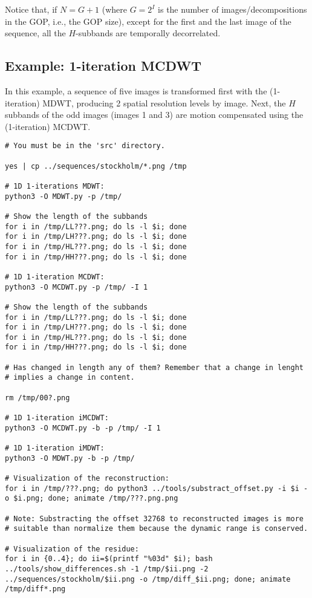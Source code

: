 Notice that, if $N=G+1$ (where $G=2^I$ is the number of
images/decompositions in the GOP, i.e., the GOP size), except for the
first and the last image of the sequence, all the $H$-subbands are
temporally decorrelated.

\subsection*{Example: 1-iteration MCDWT}
In this example, a sequence of five images is transformed first with
the (1-iteration) MDWT, producing 2 spatial resolution levels by
image. Next, the $H$ subbands of the odd images (images 1 and 3) are
motion compensated using the (1-iteration) MCDWT.

\begin{verbatim}
# You must be in the 'src' directory.

yes | cp ../sequences/stockholm/*.png /tmp

# 1D 1-iterations MDWT:
python3 -O MDWT.py -p /tmp/

# Show the length of the subbands
for i in /tmp/LL???.png; do ls -l $i; done
for i in /tmp/LH???.png; do ls -l $i; done
for i in /tmp/HL???.png; do ls -l $i; done
for i in /tmp/HH???.png; do ls -l $i; done

# 1D 1-iteration MCDWT:
python3 -O MCDWT.py -p /tmp/ -I 1

# Show the length of the subbands
for i in /tmp/LL???.png; do ls -l $i; done
for i in /tmp/LH???.png; do ls -l $i; done
for i in /tmp/HL???.png; do ls -l $i; done
for i in /tmp/HH???.png; do ls -l $i; done

# Has changed in length any of them? Remember that a change in lenght
# implies a change in content.

rm /tmp/00?.png

# 1D 1-iteration iMCDWT:
python3 -O MCDWT.py -b -p /tmp/ -I 1

# 1D 1-iteration iMDWT:
python3 -O MDWT.py -b -p /tmp/

# Visualization of the reconstruction:
for i in /tmp/???.png; do python3 ../tools/substract_offset.py -i $i -o $i.png; done; animate /tmp/???.png.png

# Note: Substracting the offset 32768 to reconstructed images is more
# suitable than normalize them because the dynamic range is conserved.

# Visualization of the residue:
for i in {0..4}; do ii=$(printf "%03d" $i); bash ../tools/show_differences.sh -1 /tmp/$ii.png -2 ../sequences/stockholm/$ii.png -o /tmp/diff_$ii.png; done; animate /tmp/diff*.png
\end{verbatim}

